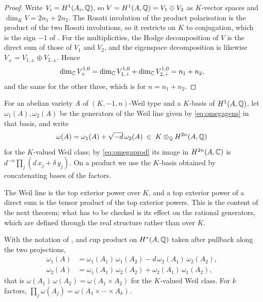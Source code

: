 \begin{proof}
Write $V_{i}=H^{1}(A_{i},\mathbb{Q})$, so $V=H^{1}(A,\mathbb{Q})=V_{1}\oplus V_{2}$ as
$K$-vector spaces and $\dim_{K}V=2n_{1}+2n_{2}$. The Rosati involution of the
product polarisation is the product of the two Rosati involutions, so it
restricts on $K$ to conjugation, which is the sign $-1$ of
. For the multiplicities, the Hodge decomposition of $V$ is
the direct sum of those of $V_{1}$ and $V_{2}$, and the eigenspace
decomposition is likewise $V_{\pm}=V_{1,\pm}\oplus V_{2,\pm}$. Hence
\[
  \dim_{\mathbb{C}}V_{+}^{1,0}
  =\dim_{\mathbb{C}}V_{1,+}^{1,0}+\dim_{\mathbb{C}}V_{2,+}^{1,0}
  =n_{1}+n_{2},
\]
and the same for the other three, which is  for
$n=n_{1}+n_{2}$.
\end{proof}

For an abelian variety $A$ of $(K,-1,n)$-Weil type and a $K$-basis of
$H^{1}(A,\mathbb{Q})$, let $\omega_{1}(A),\omega_{2}(A)$ be the generators of the
Weil line given by \eqref{eq:omegagens} in that basis, and write
\[
  \omega(A)=\omega_{1}(A)+\sqrt{-d}\,\omega_{2}(A)\;\in\;
  K\otimes_{\mathbb{Q}}H^{2n}(A,\mathbb{Q})
\]
for the $K$-valued Weil class; by \eqref{eq:omegaprod} its image in
$H^{2n}(A,\mathbb{C})$ is $d^{-n}\prod_{j}(d\,x_{j}+\delta\,y_{j})$. On a product we
use the $K$-basis obtained by concatenating bases of the factors.

The Weil line is the top exterior power over $K$, and a top exterior power of
a direct sum is the tensor product of the top exterior powers. This is the
content of the next theorem; what has to be checked is its effect on the
rational generators, which are defined through the real structure rather
than over $K$.

\begin{theorem}\label{thm:weilmult}
With the notation of , and cup product on
$H^{*}(A,\mathbb{Q})$ taken after pullback along the two projections,
\begin{equation}\label{eq:weilmult}
\begin{aligned}
  \omega_{1}(A)&=\omega_{1}(A_{1})\,\omega_{1}(A_{2})
    -d\,\omega_{2}(A_{1})\,\omega_{2}(A_{2}),\\
  \omega_{2}(A)&=\omega_{1}(A_{1})\,\omega_{2}(A_{2})
    +\omega_{2}(A_{1})\,\omega_{1}(A_{2}),
\end{aligned}
\end{equation}
that is $\omega(A_{1})\,\omega(A_{2})=\omega(A_{1}\times A_{2})$ for the
$K$-valued Weil class. For $k$ factors,
$\prod_{j}\omega(A_{j})=\omega(A_{1}\times\cdots\times A_{k})$.
\end{theorem}

